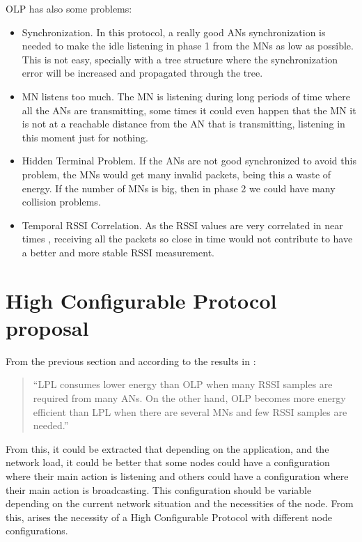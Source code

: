 \ac{OLP} has also some problems:

\begin{itemize}
 \item Synchronization. In this protocol, a really good \acp{AN} synchronization is needed to make the idle listening in phase 1 from the 
\acp{MN} as low as possible. This is not easy, specially with a tree structure where the synchronization error will be increased and 
propagated through the tree.
 \item \ac{MN} listens too much. The \ac{MN} is listening during long periods of time where all the \acp{AN} are transmitting, some times it
could even happen that the \ac{MN} it is not at a reachable distance from the \ac{AN} that is transmitting, listening in this moment just 
for nothing.
 \item Hidden Terminal Problem. If the \acp{AN} are not good synchronized to avoid this problem, the \acp{MN} would get many invalid 
packets, being this a waste of energy. If the number of \acp{MN} is big, then in phase 2 we could have many collision problems.
 \item Temporal \ac{RSSI} Correlation. As the \ac{RSSI} values are very correlated in near times \cite{RSSIcorrelated}, receiving all 
the packets so close in time would not contribute to have a better and more stable \ac{RSSI} measurement.
\end{itemize}
 

\section{High Configurable Protocol proposal}

From the previous section and according to the results in \cite{LPLandOLP}:
\begin{quote}
``LPL consumes lower energy than OLP when many RSSI samples are required from many ANs. On the other hand,
OLP becomes more energy efficient than LPL when there are several MNs and few RSSI samples are needed.''\cite{LPLandOLP}
\end{quote}

From this, it could be extracted that depending on the application, and the network load, it could be better that some nodes could have a 
configuration where their main action is listening and others could have a configuration where their main action is broadcasting. This 
configuration should be variable depending on the current network situation and the necessities of the node. From this, arises the necessity
of a High Configurable Protocol with different node configurations.

